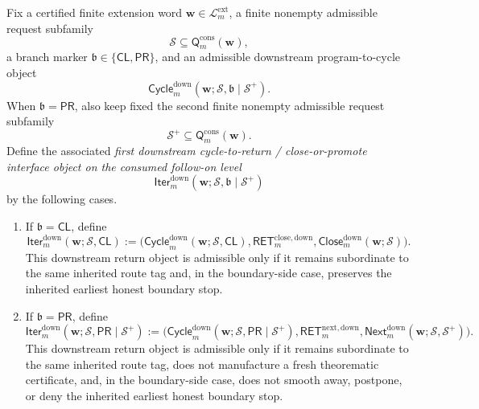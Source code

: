 \begin{definition}
\label{def:first-downstream-cycle-to-return-close-or-promote-interface-object-on-the-consumed-follow-on-level}
Fix a certified finite extension word \(\mathbf w\in\mathcal L^{\mathrm{ext}}_{m}\), a finite nonempty admissible request subfamily
\[
 \mathcal S \subseteq \mathsf{Q}^{\mathrm{cons}}_{m}(\mathbf w),
\]
a branch marker \(\mathfrak b\in\{\mathsf{CL},\mathsf{PR}\}\), and an admissible downstream program-to-cycle object
\[
 \mathsf{Cycle}^{\mathrm{down}}_{m}(\mathbf w;\mathcal S,\mathfrak b\mid\mathcal S^{+}).
\]
When \(\mathfrak b=\mathsf{PR}\), also keep fixed the second finite nonempty admissible request subfamily
\[
 \mathcal S^{+}\subseteq \mathsf{Q}^{\mathrm{cons}}_{m}(\mathbf w).
\]
Define the associated \emph{first downstream cycle-to-return / close-or-promote interface object on the consumed follow-on level}
{\small
\[
 \mathsf{Iter}^{\mathrm{down}}_{m}(\mathbf w;\mathcal S,\mathfrak b\mid\mathcal S^{+})
\]
}
by the following cases.
\begin{enumerate}[label=(\roman*)]
 \item If \(\mathfrak b=\mathsf{CL}\), define
{\small
\[
 \mathsf{Iter}^{\mathrm{down}}_{m}(\mathbf w;\mathcal S,\mathsf{CL})
 :=
 \bigl(\mathsf{Cycle}^{\mathrm{down}}_{m}(\mathbf w;\mathcal S,\mathsf{CL}),\mathsf{RET}^{\mathrm{close,down}}_{m},\mathsf{Close}^{\mathrm{down}}_{m}(\mathbf w;\mathcal S)\bigr).
\]
}
This downstream return object is admissible only if it remains subordinate to the same inherited route tag and, in the boundary-side case, preserves the inherited earliest honest boundary stop.

 \item If \(\mathfrak b=\mathsf{PR}\), define
{\small
\[
 \mathsf{Iter}^{\mathrm{down}}_{m}(\mathbf w;\mathcal S,\mathsf{PR}\mid\mathcal S^{+})
 :=
 \bigl(\mathsf{Cycle}^{\mathrm{down}}_{m}(\mathbf w;\mathcal S,\mathsf{PR}\mid\mathcal S^{+}),\mathsf{RET}^{\mathrm{next,down}}_{m},\mathsf{Next}^{\mathrm{down}}_{m}(\mathbf w;\mathcal S,\mathcal S^{+})\bigr).
\]
}
This downstream return object is admissible only if it remains subordinate to the same inherited route tag, does not manufacture a fresh theorematic certificate, and, in the boundary-side case, does not smooth away, postpone, or deny the inherited earliest honest boundary stop.
\end{enumerate}
\end{definition}

